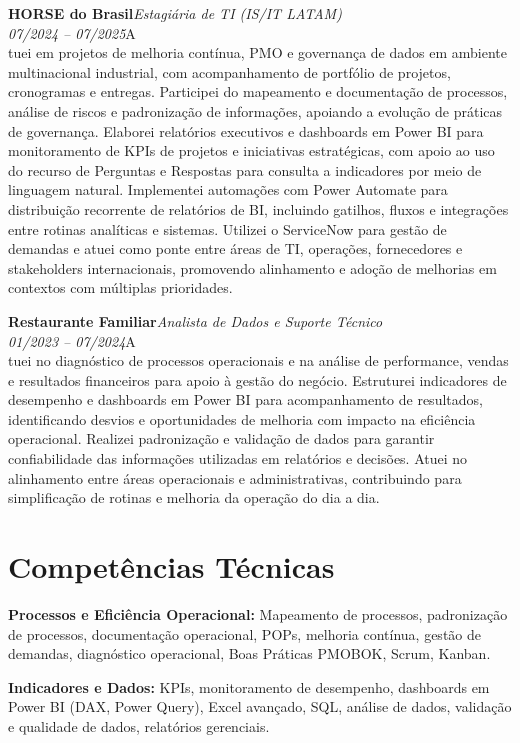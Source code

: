 \documentclass[11pt,a4paper]{article}
\newcommand{\cvrole}[4]{%
  \vspace{4pt}%
  {\bfseries\color{accentcolor}#1}\hfill{\itshape #2}\\[-2pt]%
  {\itshape #3}\hfill #4\\[6pt]%
}
\begin{document}
\cvrole{HORSE do Brasil}{Estagiária de TI (IS/IT LATAM)}{07/2024 -- 07/2025}

Atuei em projetos de melhoria contínua, PMO e governança de dados em ambiente multinacional industrial, com acompanhamento de portfólio de projetos, cronogramas e entregas. Participei do mapeamento e documentação de processos, análise de riscos e padronização de informações, apoiando a evolução de práticas de governança. Elaborei relatórios executivos e dashboards em Power BI para monitoramento de KPIs de projetos e iniciativas estratégicas, com apoio ao uso do recurso de Perguntas e Respostas para consulta a indicadores por meio de linguagem natural. Implementei automações com Power Automate para distribuição recorrente de relatórios de BI, incluindo gatilhos, fluxos e integrações entre rotinas analíticas e sistemas. Utilizei o ServiceNow para gestão de demandas e atuei como ponte entre áreas de TI, operações, fornecedores e stakeholders internacionais, promovendo alinhamento e adoção de melhorias em contextos com múltiplas prioridades.

\cvrole{Restaurante Familiar}{Analista de Dados e Suporte Técnico}{01/2023 -- 07/2024}

Atuei no diagnóstico de processos operacionais e na análise de performance, vendas e resultados financeiros para apoio à gestão do negócio. Estruturei indicadores de desempenho e dashboards em Power BI para acompanhamento de resultados, identificando desvios e oportunidades de melhoria com impacto na eficiência operacional. Realizei padronização e validação de dados para garantir confiabilidade das informações utilizadas em relatórios e decisões. Atuei no alinhamento entre áreas operacionais e administrativas, contribuindo para simplificação de rotinas e melhoria da operação do dia a dia.

\section{Competências Técnicas}

\textbf{Processos e Eficiência Operacional:} Mapeamento de processos, padronização de processos, documentação operacional, POPs, melhoria contínua, gestão de demandas, diagnóstico operacional, Boas Práticas PMOBOK, Scrum, Kanban.

\textbf{Indicadores e Dados:} KPIs, monitoramento de desempenho, dashboards em Power BI (DAX, Power Query), Excel avançado, SQL, análise de dados, validação e qualidade de dados, relatórios gerenciais.
\end{document}
